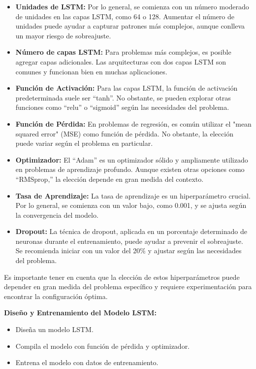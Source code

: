 \begin{itemize}
  \item \textbf{Unidades de LSTM:} Por lo general, se comienza con un número moderado de unidades en las capas LSTM, como 64 o 128. Aumentar el número de unidades puede ayudar a capturar patrones más complejos, aunque conlleva un mayor riesgo de sobreajuste.

  \item \textbf{Número de capas LSTM:} Para problemas más complejos, es posible agregar capas adicionales. Las arquitecturas con dos capas LSTM son comunes y funcionan bien en muchas aplicaciones.

  \item \textbf{Función de Activación:} Para las capas LSTM, la función de activación predeterminada suele ser “tanh”. No obstante, se pueden explorar otras funciones como “relu” o “sigmoid” según las necesidades del problema.

  \item \textbf{Función de Pérdida:} En problemas de regresión, es común utilizar el "mean squared error" (MSE) como función de pérdida. No obstante, la elección puede variar según el problema en particular.

  \item \textbf{Optimizador:} El “Adam” es un optimizador sólido y ampliamente utilizado en problemas de aprendizaje profundo. Aunque existen otras opciones como “RMSprop,” la elección depende en gran medida del contexto.

  \item \textbf{Tasa de Aprendizaje:} La tasa de aprendizaje es un hiperparámetro crucial. Por lo general, se comienza con un valor bajo, como 0.001, y se ajusta según la convergencia del modelo.

  \item \textbf{Dropout:} La técnica de dropout, aplicada en un porcentaje determinado de neuronas durante el entrenamiento, puede ayudar a prevenir el sobreajuste. Se recomienda iniciar con un valor del 20\% y ajustar según las necesidades del problema.
\end{itemize}

Es importante tener en cuenta que la elección de estos hiperparámetros puede
depender en gran medida del problema específico y requiere experimentación para
encontrar la configuración óptima.

\vspace{1\baselineskip}
\textbf{Diseño y Entrenamiento del Modelo LSTM:}
\begin{itemize}
  \item Diseña un modelo LSTM.
  \item Compila el modelo con función de pérdida y optimizador.
  \item Entrena el modelo con datos de entrenamiento.
\end{itemize}

